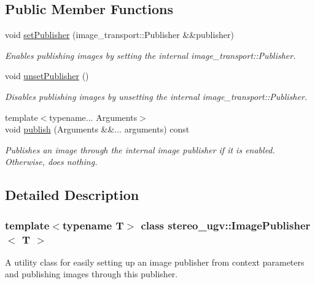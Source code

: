 \subsection*{Public Member Functions}
\begin{DoxyCompactItemize}
\item 
void \hyperlink{classstereo__ugv_1_1ImagePublisher_a0ac69be931e19269b89b66da7bbfc00b}{set\+Publisher} (image\+\_\+transport\+::\+Publisher \&\&publisher)
\begin{DoxyCompactList}\small\item\em Enables publishing images by setting the internal image\+\_\+transport\+::\+Publisher. \end{DoxyCompactList}\item 
\mbox{\label{classstereo__ugv_1_1ImagePublisher_acabc2dc754dc1e101911665fc6cc9ba1}} 
void \hyperlink{classstereo__ugv_1_1ImagePublisher_acabc2dc754dc1e101911665fc6cc9ba1}{unset\+Publisher} ()
\begin{DoxyCompactList}\small\item\em Disables publishing images by unsetting the internal image\+\_\+transport\+::\+Publisher. \end{DoxyCompactList}\item 
{\footnotesize template$<$typename... Arguments$>$ }\\void \hyperlink{classstereo__ugv_1_1ImagePublisher_a699e36f701182496561852715407ed37}{publish} (Arguments \&\&... arguments) const
\begin{DoxyCompactList}\small\item\em Publishes an image through the internal image publisher if it is enabled. Otherwise, does nothing. \end{DoxyCompactList}\end{DoxyCompactItemize}


\subsection{Detailed Description}
\subsubsection*{template$<$typename T$>$\newline
class stereo\+\_\+ugv\+::\+Image\+Publisher$<$ T $>$}

A utility class for easily setting up an image publisher from context parameters and publishing images through this publisher. 



